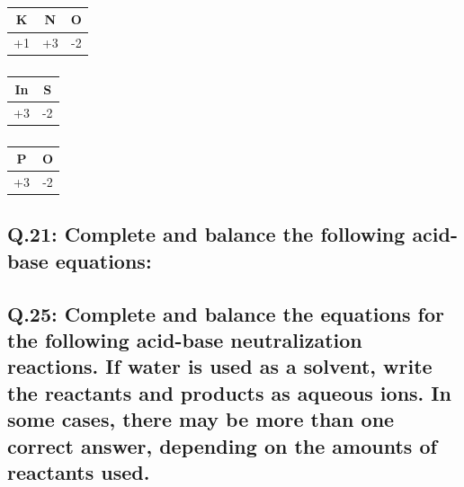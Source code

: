 \documentclass[10pt, letterpaper]{article}
\begin{document}
\subsubsection*{}
\begin{center}
	\begin{tabular}{|c|c|c|}
		\hline
		K & N & O \\
		\hline
		+1 & +3 & -2 \\
		\hline
	\end{tabular}
\end{center}
\subsubsection*{}
\begin{center}
	\begin{tabular}{|c|c|}
		\hline
		In & S \\
		\hline
		+3 & -2 \\
		\hline
	\end{tabular}
\end{center}
\subsubsection*{}
\begin{center}
	\begin{tabular}{|c|c|}
		\hline
		P & O \\
		\hline
		+3 & -2 \\
		\hline
	\end{tabular}
\end{center}
\subsection*{Q.21: Complete and balance the following acid-base equations:}
\subsubsection*{}
\subsubsection*{}
\subsection*{Q.25: Complete and balance the equations for the following
acid-base neutralization reactions. If water is used as a solvent,
write the reactants and products as aqueous ions.
In some cases, there may be more than one correct answer,
depending on the amounts of reactants used.}
\end{document}

